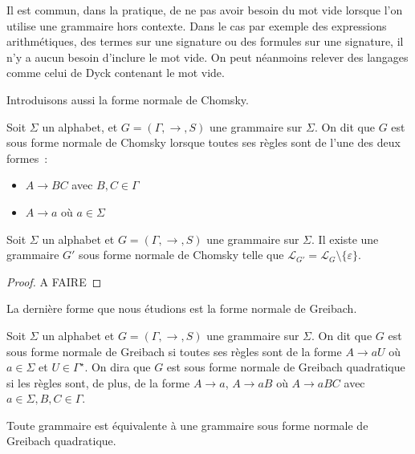 \begin{remark}
  Il est commun, dans la pratique, de ne pas avoir besoin du mot vide lorsque
  l'on utilise une grammaire hors contexte. Dans le cas par exemple des
  expressions arithmétiques, des termes sur une signature ou des formules sur
  une signature, il n'y a aucun besoin d'inclure le mot vide. On peut néanmoins
  relever des langages comme celui de Dyck contenant le mot vide.
\end{remark}

Introduisons aussi la forme normale de Chomsky.

\begin{definition}
  Soit $\Sigma$ un alphabet, et $G = (\Gamma, \to, S)$ une grammaire sur
  $\Sigma$. On dit que $G$ est sous forme normale de Chomsky lorsque toutes
  ses règles sont de l'une des deux formes~:
  \begin{itemize}
  \item $A \to BC$ avec $B,C\in \Gamma$
  \item $A \to a$ où $a \in \Sigma$
  \end{itemize}
\end{definition}

\begin{proposition}
  Soit $\Sigma$ un alphabet et $G = (\Gamma,\to,S)$ une grammaire sur $\Sigma$.
  Il existe une grammaire $G'$ sous forme normale de Chomsky telle que
  $\mathcal L_{G'} = \mathcal L_G\setminus \{\varepsilon\}$.
\end{proposition}

\begin{proof}
  A FAIRE
\end{proof}

La dernière forme que nous étudions est la forme normale de Greibach.

\begin{definition}
  Soit $\Sigma$ un alphabet et $G = (\Gamma,\to,S)$ une grammaire sur $\Sigma$.
  On dit que $G$ est sous forme normale de Greibach si toutes ses règles sont
  de la forme $A \to aU$ où $a \in \Sigma$ et $U \in \Gamma^\star$. On dira que
  $G$ est sous forme normale de Greibach quadratique si les règles sont, de
  plus, de la forme $A \to a$, $A \to aB$ où $A \to aBC$ avec
  $a\in\Sigma, B,C \in \Gamma$.
\end{definition}

\begin{proposition}
  Toute grammaire est équivalente à une grammaire sous forme normale de Greibach
  quadratique.
\end{proposition}

